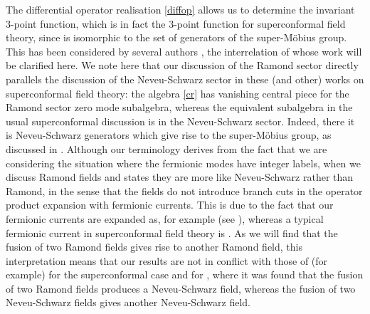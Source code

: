 \documentclass[a4paper,12pt]{article}
\def\fsl         {sl(2|1;\mathbb C)}
\begin{document}
The differential operator realisation \eqref{diffop} allows us to
determine the \myHighlight{$\fsl$}\coordHE{} invariant 3-point function, which is in
fact the 3-point function for \coordHE{} superconformal field theory,
since \myHighlight{$\fsl$}\coordHE{} is isomorphic to the set of generators of the \coordHE{}
super-M\"{o}bius group.  This has been considered by several authors
\cite{Kir, MSS, West, Bl}, the interrelation of whose work will be
clarified here.   We note here that our discussion
of the Ramond sector directly parallels the discussion of the
Neveu-Schwarz sector in these (and other) works on superconformal
field theory: the algebra \eqref{cr} has vanishing central piece for the
Ramond sector zero mode subalgebra, whereas the equivalent subalgebra
in the usual superconformal discussion is in the Neveu-Schwarz
sector.  Indeed, there it is Neveu-Schwarz generators which give rise to
the super-M\"{o}bius group, as discussed in \cite{West}.  Although our
terminology derives from the fact that we are considering the
situation where the fermionic modes have integer labels, when we
discuss Ramond fields and states they are more like Neveu-Schwarz
rather than Ramond, in the sense that the fields do not introduce branch
cuts in the operator product expansion with fermionic currents.  This is 
due to the fact that our fermionic currents are expanded as, for example 
(see \cite{BHT98}), 
\coordHE{} whereas a typical 
fermionic current in superconformal field theory is \coordHE{}.  As we
will find that the fusion of two Ramond fields gives rise to another
Ramond field, this interpretation means that our results are not in
conflict with those of (for example) \cite{Watts} for the \coordHE{}
superconformal case and \cite{MSS} for \coordHE{}, where it was found
that the fusion of two Ramond fields produces a Neveu-Schwarz field,
whereas the fusion of two Neveu-Schwarz fields gives another
Neveu-Schwarz field.  
 
\end{document}
